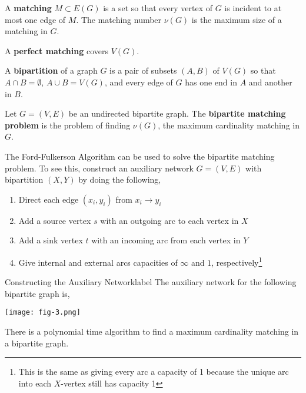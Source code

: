 	\begin{defn}[Matching]
		A \textbf{matching} $M \subset E(G)$ is a set so that every vertex of $G$ is incident to at most one edge of $M$. The matching number $\nu(G)$ is the maximum size of a matching in $G$.
	\end{defn}

	\begin{defn}
		A \textbf{perfect matching} covers $V(G)$.
	\end{defn}

	\begin{defn}[Bipartition]
		A \textbf{bipartition} of a graph $G$ is a pair of subsets $(A, B)$ of $V(G)$ so that $A \cap B = \emptyset$, $A \cup B = V(G)$, and every edge of $G$ has one end in $A$ and another in $B$.
	\end{defn}

	\begin{defn}
		Let $G = (V, E)$ be an undirected bipartite graph. The \textbf{bipartite matching problem} is the problem of finding $\nu(G)$, the maximum cardinality matching in $G$.
	\end{defn}
 
 	The Ford-Fulkerson Algorithm can be used to solve the bipartite matching problem. To see this, construct an auxiliary network $G = (V, E)$ with bipartition $(X, Y)$ by doing the following,
 	\begin{enumerate}
 		\item Direct each edge $(x_i, y_i)$ from $x_i \rightarrow y_i$
			\item Add a source vertex $s$ with an outgoing arc to each vertex in $X$
			\item Add a sink vertex $t$ with an incoming arc from each vertex in $Y$
			\item Give internal and external arcs capacities of $\infty$ and $1$, respectively\footnote{This is the same as giving every arc a capacity of 1 because the unique arc into each $X$-vertex still has capacity 1}
 	\end{enumerate}

	\begin{ex}{Constructing the Auxiliary Network}{label}
		The auxiliary network for the following bipartite graph is,
		\begin{center}
		\texttt{[image: fig-3.png]}
		\end{center}
	\end{ex}

	\begin{thm}
		There is a polynomial time algorithm to find a maximum cardinality matching in a bipartite graph.
	\end{thm}

